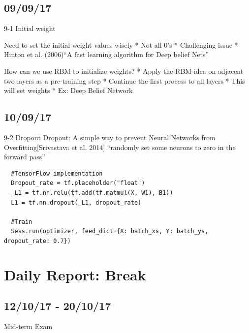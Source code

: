 \documentclass{article}
\begin{document}
\begin{CJK}{UTF8}{}
\subsection{09/09/17}
9-1 Initial weight\newline

Need to set the initial weight values wisely\newline
*	Not all 0’s\newline
*	Challenging issue\newline
*	Hinton et al. (2006)“A fast learning algorithm for Deep belief Nets”\newline

How can we use RBM to initialize weights?\newline
*	Apply the RBM idea on adjacent two layers as a pre-training step\newline
*	Continue the first process to all layers\newline
*	This will set weights\newline
*	Ex: Deep Belief Network\newline

\subsection{10/09/17}
9-2 Dropout\newline
Dropout: A simple way to prevent Neural Networks from Overfitting[Srivastava et al. 2014]\newline
“randomly set some neurons to zero in the forward pass”\newline
\begin{verbatim}
  #TensorFlow implementation
  Dropout_rate = tf.placeholder("float")
  _L1 = tf.nn.relu(tf.add(tf.matmul(X, W1), B1))
  L1 = tf.nn.dropout(_L1, dropout_rate)

  #Train
  Sess.run(optimizer, feed_dict={X: batch_xs, Y: batch_ys, dropout_rate: 0.7})

\end{verbatim}\newline

\section{Daily Report: Break}
\subsection{12/10/17 - 20/10/17}
Mid-term Exam\newline


\end{CJK}
\end{document}
